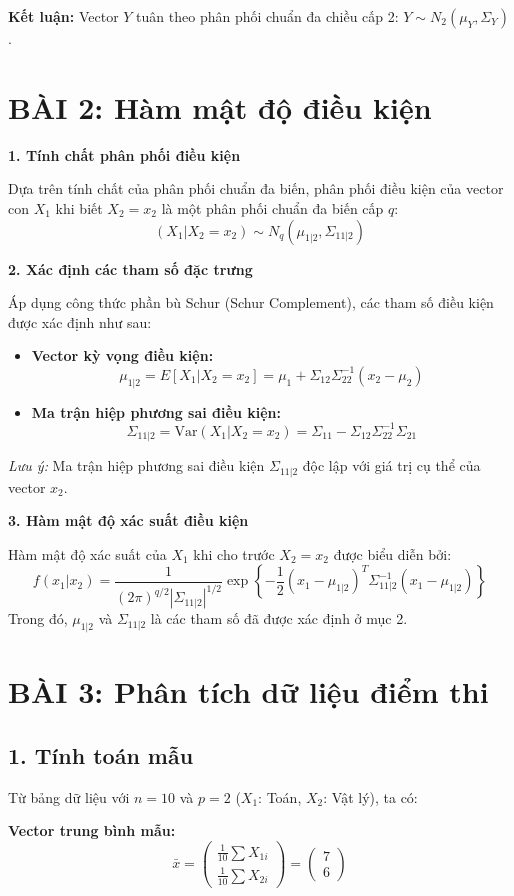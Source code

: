\documentclass[12pt, a4paper]{article}
\begin{document}
\textbf{Kết luận:} Vector $Y$ tuân theo phân phối chuẩn đa chiều cấp 2: $Y \sim N_2(\mu_Y, \Sigma_Y)$.


\section*{BÀI 2: Hàm mật độ điều kiện}

\textbf{1. Tính chất phân phối điều kiện}

Dựa trên tính chất của phân phối chuẩn đa biến, phân phối điều kiện của vector con $X_1$ khi biết $X_2 = x_2$ là một phân phối chuẩn đa biến cấp $q$:
\[ (X_1 | X_2 = x_2) \sim N_q(\mu_{1|2}, \Sigma_{11|2}) \]

\textbf{2. Xác định các tham số đặc trưng}

Áp dụng công thức phần bù Schur (Schur Complement), các tham số điều kiện được xác định như sau:
\begin{itemize}
    \item \textbf{Vector kỳ vọng điều kiện:}
    \[ \mu_{1|2} = E[X_1 | X_2 = x_2] = \mu_1 + \Sigma_{12}\Sigma_{22}^{-1}(x_2 - \mu_2) \]
    \item \textbf{Ma trận hiệp phương sai điều kiện:}
    \[ \Sigma_{11|2} = \text{Var}(X_1 | X_2 = x_2) = \Sigma_{11} - \Sigma_{12}\Sigma_{22}^{-1}\Sigma_{21} \]
\end{itemize}
\textit{Lưu ý:} Ma trận hiệp phương sai điều kiện $\Sigma_{11|2}$ độc lập với giá trị cụ thể của vector $x_2$.

\textbf{3. Hàm mật độ xác suất điều kiện}

Hàm mật độ xác suất của $X_1$ khi cho trước $X_2 = x_2$ được biểu diễn bởi:
\[ f(x_1 | x_2) = \frac{1}{(2\pi)^{q/2} |\Sigma_{11|2}|^{1/2}} \exp \left\{ -\frac{1}{2} (x_1 - \mu_{1|2})^T \Sigma_{11|2}^{-1} (x_1 - \mu_{1|2}) \right\} \]
Trong đó, $\mu_{1|2}$ và $\Sigma_{11|2}$ là các tham số đã được xác định ở mục 2.

\section*{BÀI 3: Phân tích dữ liệu điểm thi}

\subsection*{1. Tính toán mẫu}

Từ bảng dữ liệu với $n = 10$ và $p = 2$ ($X_1$: Toán, $X_2$: Vật lý), ta có:

\textbf{Vector trung bình mẫu:}
\[ \bar{x} = \begin{pmatrix} \frac{1}{10} \sum X_{1i} \\ \frac{1}{10} \sum X_{2i} \end{pmatrix} = \begin{pmatrix} 7 \\ 6 \end{pmatrix} \]
\end{document}
